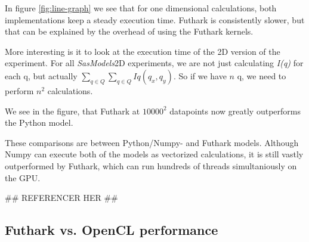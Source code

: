 \documentclass[11pt]{article}
\newcommand{\sasmodels}{\textit{SasModels}}
\newcommand{\iq}{\textit{I(q)}}
\begin{document}
In figure \ref{fig:line-graph} we see that for one dimensional calculations,
both implementations keep a steady execution time. Futhark is consistently 
slower, but that can be explained by the overhead of using the Futhark kernels.

More interesting is it to look at the execution time of the 2D version of the 
experiment. For all \sasmodels 2D experiments, we are not just calculating \iq
for each q, but actually $\sum_{q \in Q} \sum_{q \in Q} Iq(q_x, q_y)$.
So if we have $n$ q, we need to perform $n^2$ calculations.

We see in the figure, that Futhark at $10000^2$ datapoints now greatly outperforms
the Python model.

\begin{mdframed}[
  frametitle={Why does Futhark perform faster than Python?},
  nobreak=true
  ]
These comparisons are between Python/Numpy- and Futhark models.
Although Numpy can execute both of the models as vectorized calculations, 
it is still vastly outperformed by Futhark, which can run hundreds of threads 
simultaniously on the GPU.

## REFERENCER HER ##
\end{mdframed}

\subsection{Futhark vs. OpenCL performance}
\end{document}
